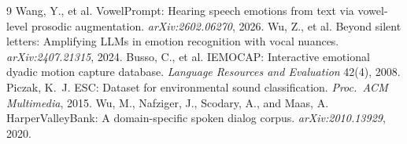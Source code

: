 \documentclass[11pt]{article}
\begin{document}
\begin{thebibliography}{9}
\small
{} Wang, Y., et al. VowelPrompt: Hearing speech emotions from text via vowel-level prosodic augmentation. \emph{arXiv:2602.06270}, 2026.
 Wu, Z., et al. Beyond silent letters: Amplifying LLMs in emotion recognition with vocal nuances. \emph{arXiv:2407.21315}, 2024.
 Busso, C., et al. IEMOCAP: Interactive emotional dyadic motion capture database. \emph{Language Resources and Evaluation} 42(4), 2008.
 Piczak, K.~J. ESC: Dataset for environmental sound classification. \emph{Proc.\ ACM Multimedia}, 2015.
 Wu, M., Nafziger, J., Scodary, A., and Maas, A. HarperValleyBank: A domain-specific spoken dialog corpus. \emph{arXiv:2010.13929}, 2020.
\end{thebibliography}
\end{document}
